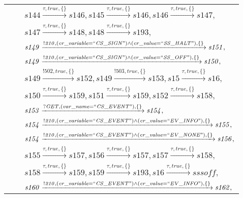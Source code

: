 \begin{tabular}{lcp{350px}}
& & $\mathit{s144}\xrightarrow{\mathit{\tau}, \mathit{true}, \{\}}\mathit{s146},\mathit{s145}\xrightarrow{\mathit{\tau}, \mathit{true}, \{\}}\mathit{s146},\mathit{s146}\xrightarrow{\mathit{\tau}, \mathit{true}, \{\}}\mathit{s147},$ \\
& & $\mathit{s147}\xrightarrow{\mathit{\tau}, \mathit{true}, \{\}}\mathit{s148},\mathit{s148}\xrightarrow{\mathit{\tau}, \mathit{true}, \{\}}\mathit{s193},$ \\
& & $\mathit{s149}\xrightarrow{\mathit{!210}, \mathit{(cr\_variable = ``CS\_SIGN") \land (cr\_value = ``SS\_HALT")}, \{\}}\mathit{s151},$ \\
& & $\mathit{s149}\xrightarrow{\mathit{!210}, \mathit{(cr\_variable = ``CS\_SIGN") \land (cr\_value = ``SS\_OFF")}, \{\}}\mathit{s150},$ \\
& & $\mathit{s149}\xrightarrow{\mathit{!502}, \mathit{true}, \{\}}\mathit{s152},\mathit{s149}\xrightarrow{\mathit{!503}, \mathit{true}, \{\}}\mathit{s153},\mathit{s15}\xrightarrow{\mathit{\tau}, \mathit{true}, \{\}}\mathit{s16},$ \\
& & $\mathit{s150}\xrightarrow{\mathit{\tau}, \mathit{true}, \{\}}\mathit{s159},\mathit{s151}\xrightarrow{\mathit{\tau}, \mathit{true}, \{\}}\mathit{s159},\mathit{s152}\xrightarrow{\mathit{\tau}, \mathit{true}, \{\}}\mathit{s158},$ \\
& & $\mathit{s153}\xrightarrow{\mathit{?GET}, \mathit{(var\_name = ``CS\_EVENT")}, \{\}}\mathit{s154},$ \\
& & $\mathit{s154}\xrightarrow{\mathit{!210}, \mathit{(cr\_variable = ``CS\_EVENT") \land (cr\_value = ``EV\_INFO")}, \{\}}\mathit{s155},$ \\
& & $\mathit{s154}\xrightarrow{\mathit{!210}, \mathit{(cr\_variable = ``CS\_EVENT") \land (cr\_value = ``EV\_NONE")}, \{\}}\mathit{s156},$ \\
& & $\mathit{s155}\xrightarrow{\mathit{\tau}, \mathit{true}, \{\}}\mathit{s157},\mathit{s156}\xrightarrow{\mathit{\tau}, \mathit{true}, \{\}}\mathit{s157},\mathit{s157}\xrightarrow{\mathit{\tau}, \mathit{true}, \{\}}\mathit{s158},$ \\
& & $\mathit{s158}\xrightarrow{\mathit{\tau}, \mathit{true}, \{\}}\mathit{s159},\mathit{s159}\xrightarrow{\mathit{\tau}, \mathit{true}, \{\}}\mathit{s193},\mathit{s16}\xrightarrow{\mathit{\tau}, \mathit{true}, \{\}}\mathit{sssoff},$ \\
& & $\mathit{s160}\xrightarrow{\mathit{!210}, \mathit{(cr\_variable = ``CS\_EVENT") \land (cr\_value = ``EV\_INFO")}, \{\}}\mathit{s162},$ \\
\end{tabular}

